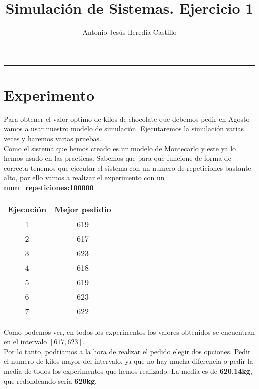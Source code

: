 \documentclass[12pt,a4paper]{article}
\newcommand{\horrule}[1]{\rule{\linewidth}{#1}} %
\begin{document}
\title{Simulación de Sistemas. Ejercicio 1}

\author{
  Antonio Jesús Heredia Castillo\\
}

\date{}
\maketitle
\horrule{2pt}
\section{Experimento}
Para obtener el valor optimo de kilos de chocolate que debemos pedir en Agosto vamos a usar nuestro modelo de simulación. Ejecutaremos la simulación varias veces y haremos varias pruebas. \\
Como el sistema que hemos creado es un modelo de Montecarlo y este ya lo hemos usado en las practicas. Sabemos que para que funcione de forma de correcta tenemos que ejecutar el sistema con un numero de repeticiones bastante alto, por ello vamos a realizar el experimento con un \textbf{num\_repeticiones:100000}\\
\begin{center}
\begin{tabular}{|c|c|}
	\hline 
	Ejecución & Mejor pedidio \\ 
	\hline 
	1&  619\\ 
	\hline 
	2&  617\\ 
	\hline 
	3&  623\\ 
	\hline 
	4&  618\\ 
	\hline 
	5&  619\\ 
	\hline 
	6&  623\\ 
	\hline 
	7&  622\\ 
	\hline 
\end{tabular} 
\end{center}

Como podemos ver, en todos los experimentos los valores obtenidos se encuentran en el intervalo $[617,623]$. \\

Por lo tanto, podríamos a la hora de realizar el pedido elegir dos opciones. Pedir el numero de kilos mayor del intervalo, ya que no hay mucha diferencia o pedir la media de todos los experimentos que hemos realizado. La media es de \textbf{620.14kg}, que redondeando seria \textbf{620kg}.
\end{document}
